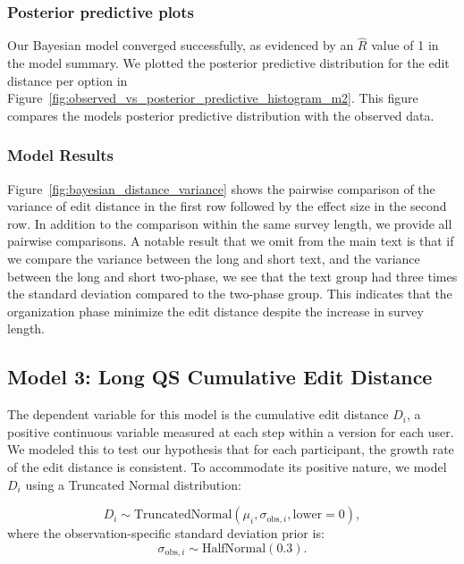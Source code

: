 \subsubsection{Posterior predictive plots}
Our Bayesian model converged successfully, as evidenced by an $\hat{R}$ value of 1 in the model summary. We plotted the posterior predictive distribution for the edit distance per option in Figure~\ref{fig:observed_vs_posterior_predictive_histogram_m2}. This figure compares the models posterior predictive distribution with the observed data.

\subsubsection{Model Results}
Figure~\ref{fig:bayesian_distance_variance} shows the pairwise comparison of the variance of edit distance in the first row followed by the effect size in the second row. In addition to the comparison within the same survey length, we provide all pairwise comparisons. A notable result that we omit from the main text is that if we compare the variance between the long and short text, and the variance between the long and short two-phase, we see that the text group had three times the standard deviation compared to the two-phase group. This indicates that the organization phase minimize the edit distance despite the increase in survey length.

\subsection{Model 3: Long QS Cumulative Edit Distance} \label{sec:apdx:model_cum_distance}

The dependent variable for this model is the cumulative edit distance $D_i$, a positive continuous variable measured at each step within a version for each user. We modeled this to test our hypothesis that for each participant, the growth rate of the edit distance is consistent. To accommodate its positive nature, we model $D_i$ using a Truncated Normal distribution:

\begin{equation}\label{eq:model3_likelihood}
D_i \sim \text{TruncatedNormal}(\mu_i, \sigma_{\text{obs},i}, \text{lower}=0),
\end{equation}
where the observation-specific standard deviation prior is:
\begin{equation}\label{eq:model3_prior_sigma}
\sigma_{\text{obs},i} \sim \text{HalfNormal}(0.3).
\end{equation}

